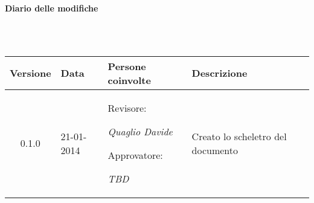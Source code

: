 \begin{Large}\textbf{Diario delle modifiche}\end{Large}\\
\\
\begin{small}
\begin{tabular}{|c|p{1.7cm}|p{2.8cm}|p{7cm}|}
\hline
Versione & Data & Persone coinvolte & Descrizione \\
\hline
\hline
0.1.0 & 21-01-2014 & Revisore: 

\textit{Quaglio Davide}

Approvatore: 

\textit{TBD} &  Creato lo scheletro del documento\\
\hline
\end{tabular}\\
\end{small}